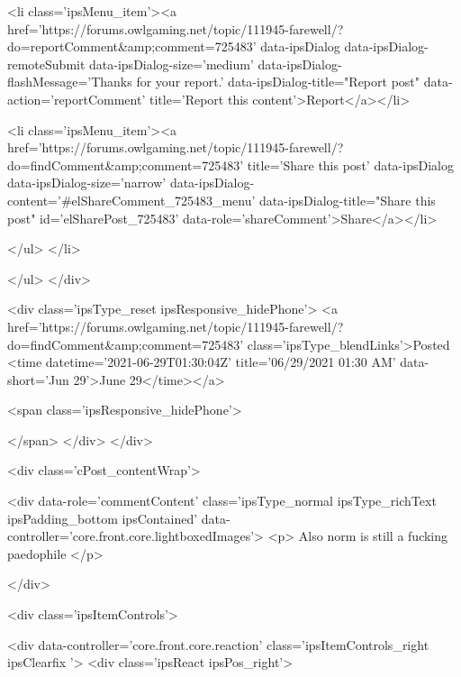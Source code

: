 							<li class='ipsMenu_item'><a href='https://forums.owlgaming.net/topic/111945-farewell/?do=reportComment&amp;comment=725483' data-ipsDialog data-ipsDialog-remoteSubmit data-ipsDialog-size='medium' data-ipsDialog-flashMessage='Thanks for your report.' data-ipsDialog-title="Report post" data-action='reportComment' title='Report this content'>Report</a></li>
						
						
							<li class='ipsMenu_item'><a href='https://forums.owlgaming.net/topic/111945-farewell/?do=findComment&amp;comment=725483' title='Share this post' data-ipsDialog data-ipsDialog-size='narrow' data-ipsDialog-content='#elShareComment_725483_menu' data-ipsDialog-title="Share this post" id='elSharePost_725483' data-role='shareComment'>Share</a></li>
						
                        
						
						
						
							
								
							
							
							
							
							
							
						
					</ul>
				</li>
				
			</ul>
		</div>

		<div class='ipsType_reset ipsResponsive_hidePhone'>
			<a href='https://forums.owlgaming.net/topic/111945-farewell/?do=findComment&amp;comment=725483' class='ipsType_blendLinks'>Posted <time datetime='2021-06-29T01:30:04Z' title='06/29/2021 01:30  AM' data-short='Jun 29'>June 29</time></a> 
			
			<span class='ipsResponsive_hidePhone'>
				
				
			</span>
		</div>
	</div>

	

    

	<div class='cPost_contentWrap'>
		
		<div data-role='commentContent' class='ipsType_normal ipsType_richText ipsPadding_bottom ipsContained' data-controller='core.front.core.lightboxedImages'>
			<p>
	Also norm is still a fucking paedophile
</p>


			
		</div>

		
			<div class='ipsItemControls'>
				
					
						

	<div data-controller='core.front.core.reaction' class='ipsItemControls_right ipsClearfix '>	
		<div class='ipsReact ipsPos_right'>
			
